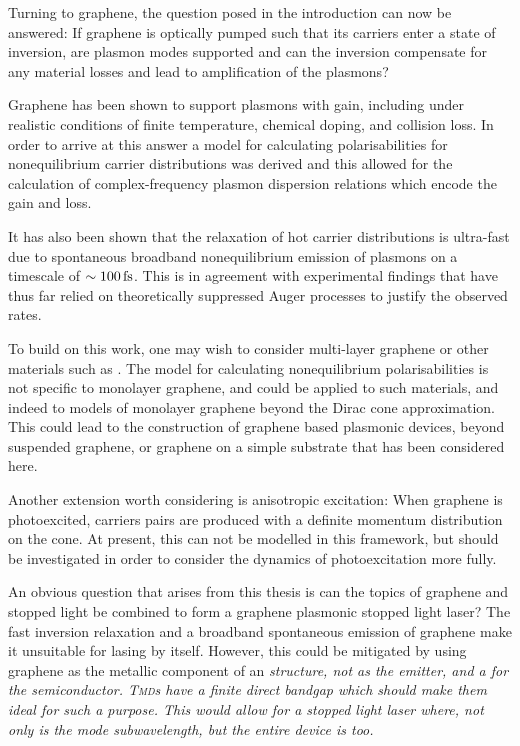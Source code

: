 Turning to graphene, the question posed in the introduction can now be answered:
If graphene is optically pumped such that its carriers enter a state of
inversion, are plasmon modes supported and can the inversion compensate for any
material losses and lead to amplification of the plasmons?

Graphene has been shown to support plasmons with gain, including under realistic
conditions of finite temperature, chemical doping, and collision loss.
In order to arrive at this answer a model for calculating polarisabilities for
nonequilibrium carrier distributions was derived and this allowed for the
calculation of complex-frequency plasmon dispersion relations which encode the
gain and loss.

It has also been shown that the relaxation of hot carrier distributions is
ultra-fast due to spontaneous broadband nonequilibrium emission of plasmons on
a timescale of $\sim100\operatorname{fs}$.
This is in agreement with experimental findings that have thus far relied on
theoretically suppressed Auger processes to justify the observed rates.

To build on this work, one may wish to consider multi-layer graphene or other
\twod materials such as \tmds.
The model for calculating nonequilibrium polarisabilities is not specific to
monolayer graphene, and could be applied to such materials, and indeed to
models of monolayer graphene beyond the Dirac cone approximation.
This could lead to the construction of graphene based plasmonic devices, beyond
suspended graphene, or graphene on a simple substrate that has been considered
here.

Another extension worth considering is anisotropic excitation:
When graphene is photoexcited, carriers pairs are produced with a definite
momentum distribution on the cone.
At present, this can not be modelled in this framework, but should be
investigated in order to consider the dynamics of photoexcitation more fully.

An obvious question that arises from this thesis is can the topics of graphene
and stopped light be combined to form a graphene plasmonic stopped light laser?
The fast inversion relaxation and a broadband spontaneous emission of graphene
make it unsuitable for lasing by itself.
However, this could be mitigated by using graphene as the metallic component of
an \sl structure, not as the emitter, and a \tmd for the semiconductor.
\textsc{Tmd}s have a finite direct bandgap which should make them ideal for such
a purpose.
This would allow for a stopped light laser where, not only is the mode
subwavelength, but the entire device is too.
